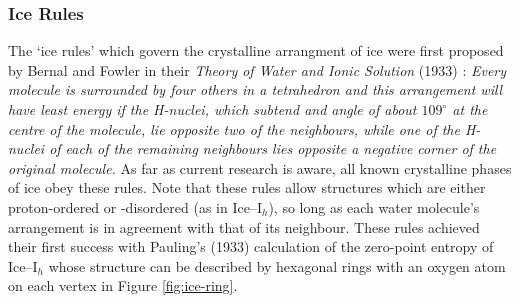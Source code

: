 \subsubsection{Ice Rules}
The `ice rules' which govern the crystalline arrangment of ice were first proposed 
by Bernal and Fowler in their \textit{Theory of Water and Ionic Solution} (1933) \cite{bernal1933}:
\textit{Every molecule is surrounded by four others in a tetrahedron and this arrangement will have least energy if the
H-nuclei, which subtend and angle of about $109^\circ$ at the centre of the molecule, lie opposite two of the
neighbours, while one of the H-nuclei of each of the remaining neighbours lies opposite a negative corner of the 
original molecule.}
As far as current research is aware, all known crystalline phases of ice obey these rules.
Note that these rules allow structures which are either proton-ordered or -disordered (as in Ice--I$_h$), so long 
as each water molecule's arrangement is in agreement with that of its neighbour.
These rules achieved their first success with Pauling's (1933) calculation of the zero-point entropy of Ice--I$_h$
whose structure can be described by hexagonal rings with an oxygen atom on each vertex in Figure \ref{fig:ice-ring}.

% 
% 

